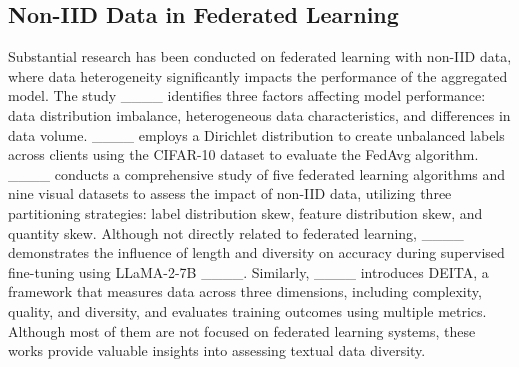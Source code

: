 \subsection{Non-IID Data in Federated Learning}
Substantial research has been conducted on federated learning with non-IID data, where data heterogeneity significantly impacts the performance of the aggregated model. The study ____ identifies three factors affecting model performance: data distribution imbalance, heterogeneous data characteristics, and differences in data volume. ____ employs a Dirichlet distribution to create unbalanced labels across clients using the CIFAR-10 dataset to evaluate the FedAvg algorithm. ____ conducts a comprehensive study of five federated learning algorithms and nine visual datasets to assess the impact of non-IID data, utilizing three partitioning strategies: label distribution skew, feature distribution skew, and quantity skew. Although not directly related to federated learning, ____ demonstrates the influence of length and diversity on accuracy during supervised fine-tuning using LLaMA-2-7B ____. Similarly, ____ introduces DEITA, a framework that measures data across three dimensions, including complexity, quality, and diversity, and evaluates training outcomes using multiple metrics. Although most of them are not focused on federated learning systems, these works provide valuable insights into assessing textual data diversity.

